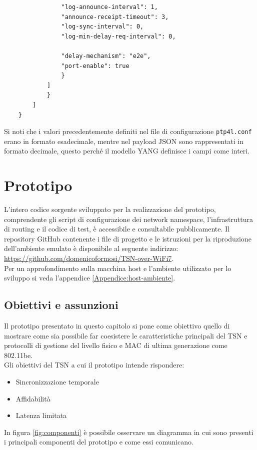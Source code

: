 \documentclass[12pt,a4paper,twoside]{book}
\begin{document}
\begin{onehalfspace}
\begin{lstlisting}
                "log-announce-interval": 1,
                "announce-receipt-timeout": 3,
                "log-sync-interval": 0,
                "log-min-delay-req-interval": 0,

                "delay-mechanism": "e2e",
                "port-enable": true
                }
            ]
            }
        ]
    }
\end{lstlisting}
Si noti che i valori precedentemente definiti nel file di configurazione \texttt{ptp4l.conf} erano in formato esadecimale, mentre nel payload JSON sono rappresentati in formato decimale, questo perché il modello YANG definisce i campi come interi.
\chapter{Prototipo}
L'intero codice sorgente sviluppato per la realizzazione del prototipo, comprendente gli script di configurazione dei network namespace, l'infrastruttura di routing e il codice di test, è accessibile e consultabile pubblicamente. Il repository GitHub contenente i file di progetto e le istruzioni per la riproduzione dell'ambiente emulato è disponibile al seguente indirizzo: \url{https://github.com/domenicoformosi/TSN-over-WiFi7}.
\\
Per un approfondimento sulla macchina host e l'ambiente utilizzato per lo sviluppo si veda l'appendice \ref{Appendice:host-ambiente}.
\section{Obiettivi e assunzioni}
Il prototipo presentato in questo capitolo si pone come obiettivo quello di mostrare come sia possibile far coesistere le caratteristiche principali del TSN e protocolli di gestione del livello fisico e MAC di ultima generazione come 802.11be.
\\
Gli obiettivi del TSN a cui il prototipo intende rispondere:
\begin{itemize}
    \item Sincronizzazione temporale
    \item Affidabilità
    \item Latenza limitata
\end{itemize}
In figura \ref{fig:componenti} è possibile osservare un diagramma in cui sono presenti i principali componenti del prototipo e come essi comunicano.


\end{onehalfspace}
\end{document}
